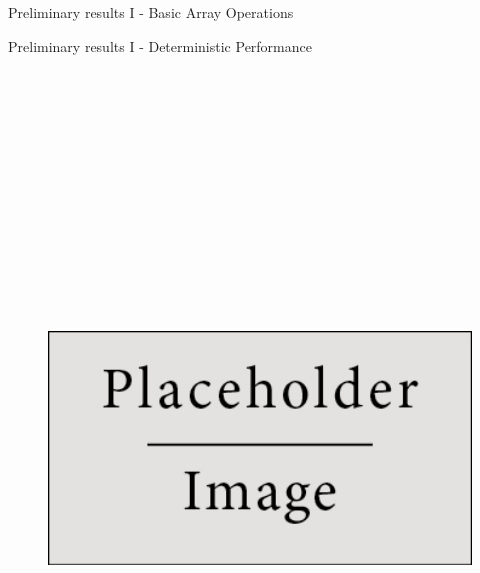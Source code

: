 \begin{block}{Preliminary results I - Basic Array Operations}

  
\end{block}

\begin{block}{Preliminary results I - Deterministic Performance}

  \begin{figure}
    \includegraphics[height=20cm]{place_holder.png}

  \end{figure}


\end{block}
